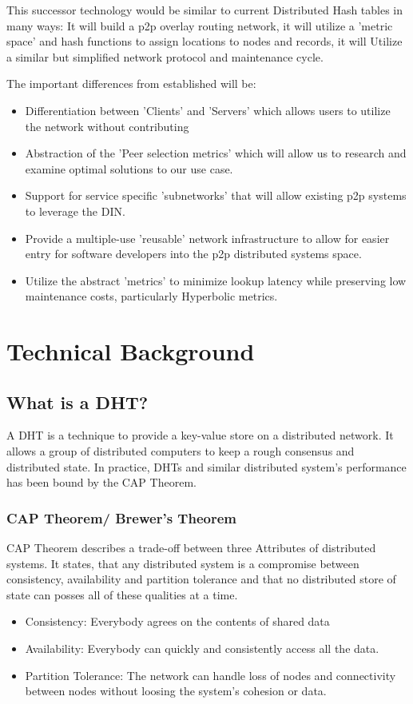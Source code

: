 This successor technology would be similar to current Distributed Hash tables in many ways: It will build a p2p overlay routing network, it will utilize a 'metric space' and hash functions to assign locations to nodes and records, it will Utilize a similar but simplified network protocol and maintenance cycle.

The important differences from established will be:

\begin{itemize}
\item Differentiation between 'Clients' and 'Servers' which allows users to utilize the network without contributing
\item Abstraction of the 'Peer selection metrics' which will allow us to research and examine optimal solutions to our use case.
\item Support for service specific 'subnetworks' that will allow existing p2p systems to leverage the DIN.
\item Provide a multiple-use 'reusable' network infrastructure to allow for easier entry for software developers into the p2p distributed systems space.
\item Utilize the abstract 'metrics' to minimize lookup latency while preserving low maintenance costs, particularly Hyperbolic metrics.
\end{itemize}









\chapter{Technical Background}
\section{What is a DHT?}
A DHT is a technique to provide a key-value store on a distributed network.
It allows a group of distributed computers to keep a rough consensus and distributed state.
In practice, DHTs and similar distributed system's performance has been bound by the CAP Theorem\cite{brewer2010certain}.

\subsection{CAP Theorem/ Brewer’s Theorem}
CAP Theorem describes a trade-off between three Attributes of distributed systems.
It states, that any distributed system is a compromise between consistency, availability and partition tolerance and that no distributed store of state can posses all of these qualities at a time.
\begin{itemize}
\item Consistency: Everybody agrees on the contents of shared data
\item Availability: Everybody can quickly and consistently access all the data.
\item Partition Tolerance: The network can handle loss of nodes and connectivity between nodes without loosing the system's cohesion or data.
\end{itemize}

